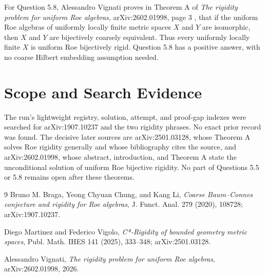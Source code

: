 \documentclass[11pt]{article}
\begin{document}
For Question 5.8, Alessandro Vignati proves in Theorem A of
\emph{The rigidity problem for uniform Roe algebras}, arXiv:2602.01998,
page 3 \cite{Vig}, that if the uniform Roe algebras of uniformly locally finite
metric spaces $X$ and $Y$ are isomorphic, then $X$ and $Y$ are bijectively
coarsely equivalent.  Thus every uniformly locally finite $X$ is uniform Roe
bijectively rigid.  Question 5.8 has a positive answer, with no coarse Hilbert
embedding assumption needed.

\section*{Scope and Search Evidence}

The run's lightweight registry, solution, attempt, and proof-gap indexes were
searched for arXiv:1907.10237 and the two rigidity phrases.  No exact prior
record was found.  The decisive later sources are arXiv:2501.03128, whose
Theorem A solves Roe rigidity generally and whose bibliography cites the
source, and arXiv:2602.01998, whose abstract, introduction, and Theorem A state
the unconditional solution of uniform Roe bijective rigidity.  No part of
Questions 5.5 or 5.8 remains open after these theorems.

\begin{thebibliography}{9}
Bruno M. Braga, Yeong Chyuan Chung, and Kang Li,
\emph{Coarse Baum--Connes conjecture and rigidity for Roe algebras},
J. Funct. Anal. 279 (2020), 108728; arXiv:1907.10237.

Diego Martinez and Federico Vigolo,
\emph{C*-Rigidity of bounded geometry metric spaces},
Publ. Math. IHES 141 (2025), 333--348; arXiv:2501.03128.

Alessandro Vignati,
\emph{The rigidity problem for uniform Roe algebras},
arXiv:2602.01998, 2026.
\end{thebibliography}
\end{document}
